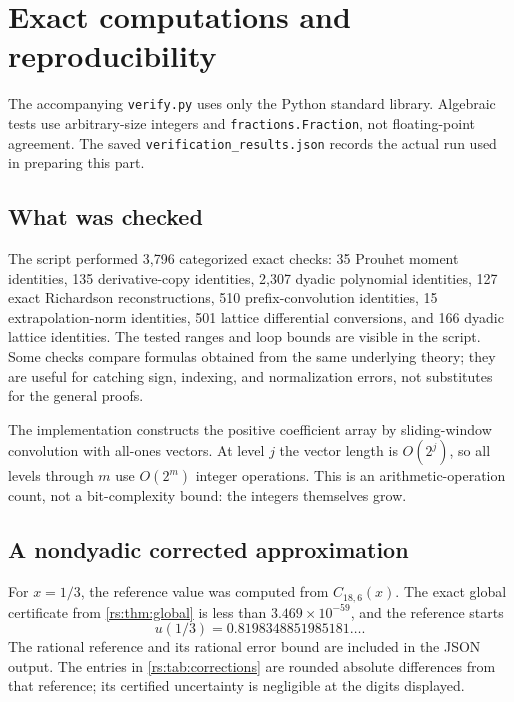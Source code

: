 \documentclass[11pt,a4paper,oneside,openany]{book}
\numberwithin{equation}{chapter}
\theoremstyle{definition}
\theoremstyle{remark}
\begin{document}
\chapter{Exact computations and reproducibility}\label{rs:sec:computations}

The accompanying \texttt{verify.py} uses only the Python standard
library. Algebraic tests use arbitrary-size integers and
\texttt{fractions.Fraction}, not floating-point agreement. The saved
\texttt{verification\_results.json} records the actual run used in
preparing this part.

\section{What was checked}

The script performed 3,796 categorized exact checks: 35 Prouhet
moment identities, 135 derivative-copy identities, 2,307 dyadic
polynomial identities, 127 exact Richardson reconstructions, 510
prefix-convolution identities, 15 extrapolation-norm identities,
501 lattice differential conversions, and 166 dyadic lattice
identities. The tested ranges and loop bounds are visible in the
script. Some checks compare formulas obtained from the same
underlying theory; they are useful for catching sign, indexing,
and normalization errors, not substitutes for the general proofs.

The implementation constructs the positive coefficient array by
sliding-window convolution with all-ones vectors. At level $j$ the
vector length is $O(2^j)$, so all levels through $m$ use $O(2^m)$
integer operations. This is an arithmetic-operation count, not a
bit-complexity bound: the integers themselves grow.

\section{A nondyadic corrected approximation}

For $x=1/3$, the reference value was computed from $C_{18,6}(x)$.
The exact global certificate from \cref{rs:thm:global} is less than
$3.469\times10^{-59}$, and the reference starts
\begin{equation}
 u(1/3)=0.8198348851985181\ldots.
\end{equation}
The rational reference and its rational error bound are included
in the JSON output. The entries in \cref{rs:tab:corrections} are
rounded absolute differences from that reference; its certified
uncertainty is negligible at the digits displayed.
\end{document}
